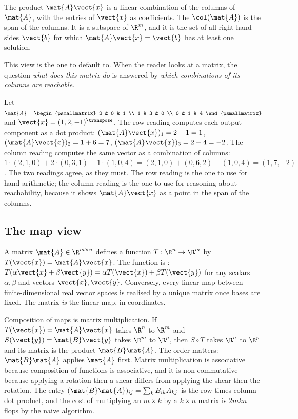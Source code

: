 The product $\mat{A}\vect{x}$ is a linear combination of the
columns of $\mat{A}$, with the entries of $\vect{x}$ as coefficients.
The  $\col(\mat{A})$ is the span of the
columns. It is a subspace of $\R^{m}$, and it is the set of all
right-hand sides $\vect{b}$ for which $\mat{A}\vect{x} = \vect{b}$
has at least one solution.

This view is the one to default to. When the reader looks at a
matrix, the question \emph{what does this matrix do} is answered by
\emph{which combinations of its columns are reachable}.

\begin{example}
Let $\mat{A} = \begin{psmallmatrix} 2 & 0 & 1 \\ 1 & 3 & 0 \\ 0 & 1
& 4 \end{psmallmatrix}$ and $\vect{x} = (1, 2, -1)^{\transpose}$.
The row reading computes each output component as a dot product:
$(\mat{A}\vect{x})_{1} = 2 - 1 = 1$, $(\mat{A}\vect{x})_{2} = 1 + 6
= 7$, $(\mat{A}\vect{x})_{3} = 2 - 4 = -2$. The column reading
computes the same vector as a combination of columns: $1\cdot(2,1,0)
+ 2\cdot(0,3,1) - 1\cdot(1,0,4) = (2,1,0) + (0,6,2) - (1,0,4) =
(1,7,-2)$. The two readings agree, as they must. The row reading is
the one to use for hand arithmetic; the column reading is the one to
use for reasoning about reachability, because it shows $\mat{A}
\vect{x}$ as a point in the span of the columns.
\end{example}

\subsection{The map view}

A matrix $\mat{A} \in \R^{m \times n}$ defines a function $T:
\R^{n} \to \R^{m}$ by $T(\vect{x}) = \mat{A}\vect{x}$. The function
is : $T(\alpha\vect{x} + \beta\vect{y}) = \alpha
T(\vect{x}) + \beta T(\vect{y})$ for any scalars $\alpha, \beta$ and
vectors $\vect{x}, \vect{y}$. Conversely, every linear map between
finite-dimensional real vector spaces is realised by a unique matrix
once bases are fixed. The matrix \emph{is} the linear map, in
coordinates.

Composition of maps is matrix multiplication. If $T(\vect{x}) =
\mat{A}\vect{x}$ takes $\R^{n}$ to $\R^{m}$ and $S(\vect{y}) =
\mat{B}\vect{y}$ takes $\R^{m}$ to $\R^{p}$, then $S \circ T$ takes
$\R^{n}$ to $\R^{p}$ and its matrix is the product $\mat{B}\mat{A}$.
The order matters: $\mat{B}\mat{A}$ applies $\mat{A}$ first. Matrix
multiplication is associative because composition of functions is
associative, and it is non-commutative because applying a rotation
then a shear differs from applying the shear then the rotation. The
entry $(\mat{B}\mat{A})_{ij} = \sum_{k} B_{ik} A_{kj}$ is the
row-times-column dot product, and the cost of multiplying an $m
\times k$ by a $k \times n$ matrix is $2mkn$ flops by the naive
algorithm.

